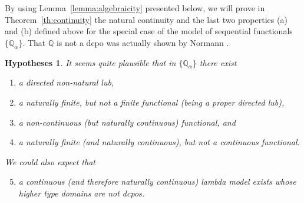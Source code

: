 \documentclass[fleqn]{LMCS}
\theoremstyle{plain}\newtheorem{satz}[thm]{Satz}
\theoremstyle{plain}\newtheorem{hyp}[thm]{Hypothesis}
\theoremstyle{plain}\newtheorem{hyps}[thm]{Hypotheses}
\theoremstyle{definition}\newtheorem{note}[thm]{Note}
\newcommand{\setof}[1]{\{#1\}}
\newcommand{\bbQ}{\mathbb{Q}}
\newcommand{\?}{\mbox{?}}
\begin{document}
By using  
Lemma~\ref{lemma:algebraicity} presented below, 
we will prove in Theorem~\ref{th:continuity} 
the natural  continuity and the last two properties (a) and (b) defined above 
for the special case of the model of sequential 
functionals $\setof{\bbQ_\alpha}$. 
That $\bbQ$ 
is not a dcpo was actually shown by Normann \cite{Normann2004}.
\begin{hyps}
It seems quite plausible
that in $\setof{\bbQ_\alpha}$ 
there exist
\begin{enumerate}[\em(1)]
\item
a directed non-natural  lub, 
\item 
a naturally finite, but not a finite functional 
(being a proper directed lub), 
\item
a non-continuous (but naturally continuous) functional, and 
\item 
a naturally finite (and naturally continuous), but not a continuous functional.
\end{enumerate}
We could also expect that 
\begin{enumerate}[\em(1)]
\setcounter{enumi}{4}
\item
a continuous (and therefore naturally continuous) lambda model exists 
whose higher type domains are not dcpos. 
\end{enumerate}
\end{hyps}
\end{document}
